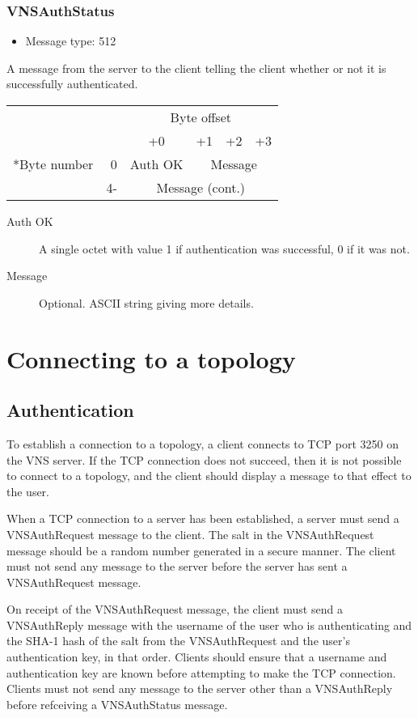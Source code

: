 \documentclass[a4paper,12pt]{report}
\begin{document}
\subsubsection{VNSAuthStatus}
\begin{itemize}
\item Message type: 512
\end{itemize}
A message from the server to the client telling the client whether or not it is successfully authenticated.
\begin{center}
\begin{tabular}{r r | c | c | c | c |}
 & & \multicolumn{4}{c}{Byte offset} \\
 & & +0 & +1 & +2 & +3 \\
\hhline{~-----}
\multirow{3}*{Byte number} & 0 & Auth OK & \multicolumn{3}{c|}{Message} \\
\hhline{~~----}
 & 4- & \multicolumn{4}{c|}{Message (cont.)}
\end{tabular}
\end{center}
\begin{description}
\item[Auth OK]  A single octet with value 1 if authentication was successful, 0 if it was not.
\item[Message]  Optional.  ASCII string giving more details.
\end{description}

\section{Connecting to a topology}
\subsection{Authentication}
To establish a connection to a topology, a client connects to TCP port 3250 on the VNS server.  If the TCP connection does not succeed, then it is not possible to connect to a topology, and the client should display a message to that effect to the user.

When a TCP connection to a server has been established, a server must send a VNSAuthRequest message to the client.  The salt in the VNSAuthRequest message should be a random number generated in a secure manner.  The client must not send any message to the server before the server has sent a VNSAuthRequest message.

On receipt of the VNSAuthRequest message, the client must send a VNSAuthReply message with the username of the user who is authenticating and the SHA-1 hash of the salt from the VNSAuthRequest and the user's authentication key, in that order.  Clients should ensure that a username and authentication key are known before attempting to make the TCP connection.  Clients must not send any message to the server other than a VNSAuthReply before refceiving a VNSAuthStatus message.
\end{document}
